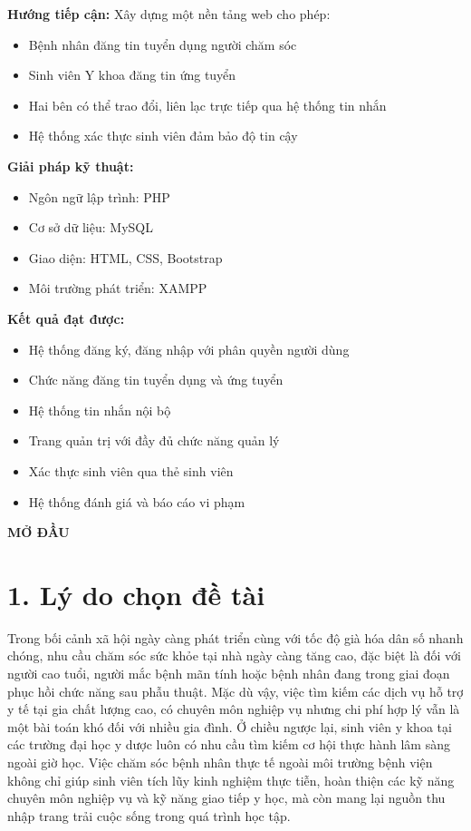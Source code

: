 \documentclass[a4paper,13pt]{extreport}
\begin{document}
\textbf{Hướng tiếp cận:} Xây dựng một nền tảng web cho phép:
\begin{itemize}
    \item Bệnh nhân đăng tin tuyển dụng người chăm sóc
    \item Sinh viên Y khoa đăng tin ứng tuyển
    \item Hai bên có thể trao đổi, liên lạc trực tiếp qua hệ thống tin nhắn
    \item Hệ thống xác thực sinh viên đảm bảo độ tin cậy
\end{itemize}

\textbf{Giải pháp kỹ thuật:}
\begin{itemize}
    \item Ngôn ngữ lập trình: PHP
    \item Cơ sở dữ liệu: MySQL
    \item Giao diện: HTML, CSS, Bootstrap
    \item Môi trường phát triển: XAMPP
\end{itemize}

\textbf{Kết quả đạt được:}
\begin{itemize}
    \item Hệ thống đăng ký, đăng nhập với phân quyền người dùng
    \item Chức năng đăng tin tuyển dụng và ứng tuyển
    \item Hệ thống tin nhắn nội bộ
    \item Trang quản trị với đầy đủ chức năng quản lý
    \item Xác thực sinh viên qua thẻ sinh viên
    \item Hệ thống đánh giá và báo cáo vi phạm
\end{itemize}

\newpage
{}
\begin{center}
\textbf{\Large MỞ ĐẦU}
\end{center}
\vspace{1cm}

\section*{1. Lý do chọn đề tài}

Trong bối cảnh xã hội ngày càng phát triển cùng với tốc độ già hóa dân số nhanh chóng, nhu cầu chăm sóc sức khỏe tại nhà ngày càng tăng cao, đặc biệt là đối với người cao tuổi, người mắc bệnh mãn tính hoặc bệnh nhân đang trong giai đoạn phục hồi chức năng sau phẫu thuật. Mặc dù vậy, việc tìm kiếm các dịch vụ hỗ trợ y tế tại gia chất lượng cao, có chuyên môn nghiệp vụ nhưng chi phí hợp lý vẫn là một bài toán khó đối với nhiều gia đình. Ở chiều ngược lại, sinh viên y khoa tại các trường đại học y dược luôn có nhu cầu tìm kiếm cơ hội thực hành lâm sàng ngoài giờ học. Việc chăm sóc bệnh nhân thực tế ngoài môi trường bệnh viện không chỉ giúp sinh viên tích lũy kinh nghiệm thực tiễn, hoàn thiện các kỹ năng chuyên môn nghiệp vụ và kỹ năng giao tiếp y học, mà còn mang lại nguồn thu nhập trang trải cuộc sống trong quá trình học tập.
\end{document}
